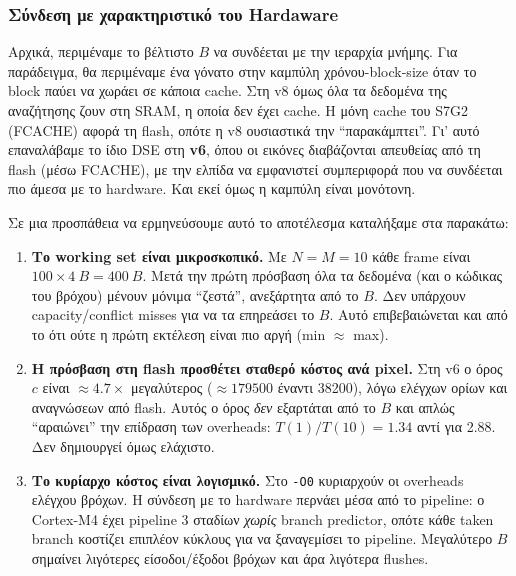 \documentclass[11pt,a4paper]{article}
\newcommand{\code}[1]{\texttt{#1}}
\newcommand{\en}[1]{\foreignlanguage{english}{#1}}
\begin{document}
\subsubsection*{Σύνδεση με χαρακτηριστικό του Hardaware}
Αρχικά, περιμέναμε το βέλτιστο $B$ να συνδέεται με την ιεραρχία
μνήμης. Για παράδειγμα, θα περιμέναμε ένα γόνατο στην καμπύλη χρόνου-block-size όταν το block παύει
να χωράει σε κάποια \en{cache}. Στη v8 όμως όλα τα δεδομένα της αναζήτησης ζουν στη SRAM, η οποία
δεν έχει \en{cache}. Η μόνη \en{cache} του S7G2 (FCACHE) αφορά τη flash, οπότε η v8 ουσιαστικά την
``παρακάμπτει''. Γι' αυτό επαναλάβαμε το ίδιο DSE στη \textbf{v6}, όπου οι εικόνες διαβάζονται
απευθείας από τη flash (μέσω FCACHE), με την ελπίδα να εμφανιστεί συμπεριφορά που να συνδέεται
πιο άμεσα με το \en{hardware}. Και εκεί όμως η καμπύλη είναι μονότονη.

Σε μια προσπάθεια να ερμηνεύσουμε αυτό το αποτέλεσμα καταλήξαμε στα παρακάτω:
\begin{enumerate}[leftmargin=*]
  \item \textbf{Το \en{working set} είναι μικροσκοπικό.} Με $N=M=10$ κάθε \en{frame} είναι
  $100\times\SI{4}{B}=\SI{400}{B}$. Μετά την πρώτη πρόσβαση όλα τα δεδομένα (και ο κώδικας του βρόχου)
  μένουν μόνιμα ``ζεστά'', ανεξάρτητα από το $B$. Δεν υπάρχουν \en{capacity/conflict misses} για να
  τα επηρεάσει το $B$. Αυτό επιβεβαιώνεται και από το ότι ούτε η πρώτη εκτέλεση είναι πιο αργή
  (min $\approx$ max).
  \item \textbf{Η πρόσβαση στη flash προσθέτει σταθερό κόστος ανά \en{pixel}.} Στη v6 ο όρος $c$ είναι
  $\approx 4.7\times$ μεγαλύτερος ($\approx\num{179500}$ έναντι \num{38200}), λόγω ελέγχων ορίων και
  αναγνώσεων από flash. Αυτός ο όρος \emph{δεν} εξαρτάται από το $B$ και απλώς ``αραιώνει'' την
  επίδραση των \en{overheads}: $T(1)/T(10)=1.34$ αντί για 2.88. Δεν δημιουργεί όμως ελάχιστο.
  \item \textbf{Το κυρίαρχο κόστος είναι λογισμικό.} Στο \code{-O0} κυριαρχούν οι \en{overheads}
  ελέγχου βρόχων. Η σύνδεση με το \en{hardware} περνάει μέσα από το \en{pipeline}: ο \en{Cortex-M4}
  έχει \en{pipeline} 3 σταδίων \emph{χωρίς} \en{branch predictor}, οπότε κάθε \en{taken branch}
  κοστίζει επιπλέον κύκλους για να ξαναγεμίσει το \en{pipeline}. Μεγαλύτερο $B$ σημαίνει λιγότερες
  είσοδοι/έξοδοι βρόχων και άρα λιγότερα \en{flushes}.
\end{enumerate}
\end{document}
